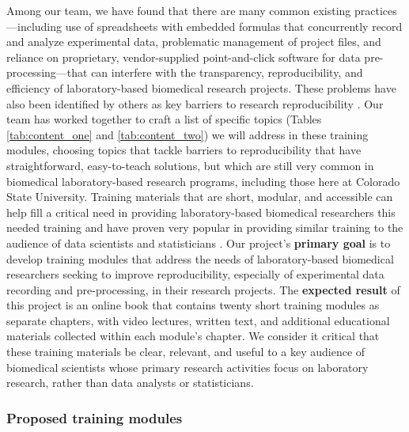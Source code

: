 \documentclass[pdftex,english,11pt,parskip=half]{scrartcl}
\begin{document}
Among our team, we have
found that there are many common existing practices---including use of
spreadsheets with embedded formulas that concurrently record and analyze
experimental data, problematic management of project files,
and reliance on proprietary, vendor-supplied point-and-click software for data
pre-processing---that can interfere with the transparency, reproducibility, and
efficiency of laboratory-based biomedical research projects. These problems have also been 
identified by others as key barriers to research reproducibility 
\cite{broman2018data, bryan2018excuse, ellis2018share, marwick2018packaging}.
Our team has worked together to craft a list of
specific topics (Tables \ref{tab:content_one} and \ref{tab:content_two}) we will address in these training modules, choosing topics that tackle barriers to reproducibility that have
straightforward, easy-to-teach solutions, but which are still very common in
biomedical laboratory-based research programs, including those here at Colorado
State University. Training materials that are short, 
modular, and accessible can help fill a critical need in providing laboratory-based biomedical researchers this needed
training \cite{munafo2017manifesto} and have proven very popular in providing 
similar training to the audience of data scientists and statisticians \cite{leek2015opinion}. Our project's \textbf{primary goal} is to develop
training modules that address the needs of laboratory-based biomedical
researchers seeking to improve reproducibility, especially of experimental data
recording and pre-processing, in their research projects. The \textbf{expected result} of
this project is an online book that contains twenty short training modules as separate
chapters, with video lectures, written text, and additional educational
materials collected within each module's chapter. We consider it critical that
these training materials be clear, relevant, and useful to a key audience of
biomedical scientists whose primary research activities focus on laboratory
research, rather than data analysts or statisticians. 

\subsubsection*{Proposed training modules}
\end{document}
